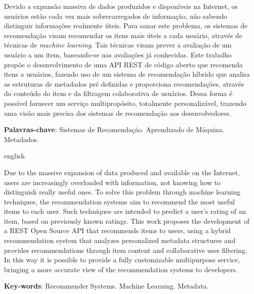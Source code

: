 \begin{resumo}
    \noindent

    Devido a expansão massiva de dados produzidos e disponíveis na Internet, os usuários estão cada vez mais sobrecarregados de informação, não sabendo distinguir informações realmente úteis. Para sanar este problema, os sistemas de recomendação visam recomendar os itens mais úteis a cada usuário, através de técnicas de \textit{machine learning}. Tais técnicas visam prever a avaliação de um usuário a um item, baseando-se nas avaliações já conhecidas. Este trabalho propõe o desenvolvimento de uma API REST de código aberto que recomenda itens a usuários, fazendo uso de um sistema de recomendação híbrido que analisa as estruturas de metadados pré definidas e proporciona recomendações, através do conteúdo do item e da filtragem colaborativa de usuários. Dessa forma é possível fornecer um serviço multipropósito, totalmente personalizável, trazendo uma visão mais precisa dos sistemas de recomendação aos desenvolvedores.

    \vspace{0.2cm}   
    \textbf{Palavras-chave}: Sistemas de Recomendação. Aprendizado de Máquina. Metadados.
\end{resumo}
 
\begin{resumo}[Abstract]	
\begin{otherlanguage*}{english}
    \noindent 
    
    Due to the massive expansion of data produced and available on the Internet, users are increasingly overloaded with information, not knowing how to distinguish really useful ones. To solve this problem through machine learning techniques, the recommendation systems aim to recommend the most useful items to each user. Such techniques are intended to predict a user's rating of an item, based on previously known ratings. This work proposes the development of a REST Open Source API that recommends items to users, using a hybrid recommendation system that analyzes personalized metadata structures and provides recommendations through item content and collaborative user filtering. In this way it is possible to provide a fully customizable multipurpose service, bringing a more accurate view of the recommendation systems to developers.
    
    \vspace{0.2cm}
    \textbf{Key-words}: Recommender Systems. Machine Learning. Metadata.
\end{otherlanguage*}
\end{resumo}

